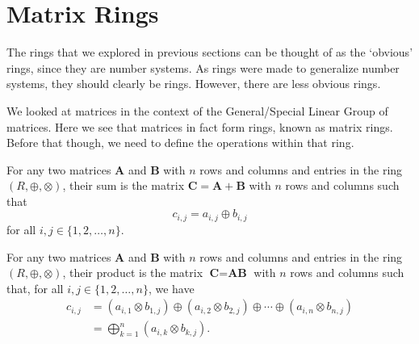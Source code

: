 \section{Matrix Rings}
The rings that we explored in previous sections can be thought of as the `obvious' rings, since they are number systems. As rings were made to generalize number systems, they should clearly be rings. However, there are less obvious rings.

We looked at matrices in the context of the General/Special Linear Group of matrices. Here we see that matrices in fact form rings, known as matrix rings. Before that though, we need to define the operations within that ring.

\begin{definition}
    For any two matrices $\textbf{A}$ and $\textbf{B}$ with $n$ rows and columns and entries in the ring $(R, \oplus, \otimes)$, their sum is the matrix $\textbf{C} = \textbf{A} + \textbf{B}$ with $n$ rows and columns such that
    \[
        c_{i,j} = a_{i,j} \oplus b_{i,j}
    \]
    for all $i,j \in \{1, 2, \dots, n\}$.
\end{definition}
\begin{definition}
    For any two matrices $\textbf{A}$ and $\textbf{B}$ with $n$ rows and columns and entries in the ring $(R, \oplus, \otimes)$, their product is the matrix $\textbf{C} = \textbf{AB}$ with $n$ rows and columns such that, for all $i,j \in \{1, 2, \dots, n\}$, we have
    \begin{align*}
        c_{i,j} &= (a_{i,1}\otimes b_{1,j}) \oplus (a_{i,2}\otimes b_{2,j}) \oplus \cdots \oplus (a_{i,n}\otimes b_{n,j})\\
        &= \bigoplus_{k=1}^n (a_{i,k}\otimes b_{k,j}).
    \end{align*}
\end{definition}

